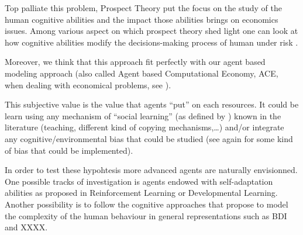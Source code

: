 \documentclass{wscpaperproc}
\begin{document}
Top palliate this problem, Prospect Theory put the focus on the study of the human cognitive abilities and the impact those abilities brings on economics issues. Among various aspect on which prospect theory shed light one can look at how cognitive abilities modify the decisions-making process of human under risk
\cite{weber_disposition_1998}.

Moreover, we think that this approach fit perfectly with our agent based modeling approach (also called Agent based Computational Economy, ACE, when dealing with economical problems, see
\cite{tesfatsion_introduction_2001}).


This subjective value is the value that agents ``put'' on each resources. It could be learn using any mechanism of ``social learning'' (as defined by \cite{lycett_cultural_2015}) known in the literature (teaching, different kind of copying mechanisms,\ldots) and/or integrate any cognitive/environmental bias that could be studied (see again \cite{lycett_cultural_2015} for some kind of bias that could be implemented).

In order to test these hypohtesis more advanced agents are naturally envisionned. One possible tracks of investigation is agents endowed with self-adaptation abilities as proposed in Reinforcement Learning or Developmental Learning. Another possibility is to follow the cognitive approaches that propose to model the complexity of the human behaviour in general representations such as BDI and XXXX.



  
\end{document}
